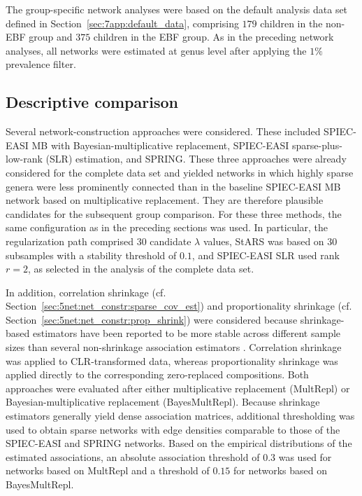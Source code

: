 The group-specific network analyses were based on the default analysis data set defined in Section~\ref{sec:7app:default_data}, comprising $179$ children in the non-EBF group and $375$ children in the EBF group. As in the preceding network analyses, all networks were estimated at genus level after applying the $1\%$ prevalence filter.

\subsection{Descriptive comparison}
\label{sec:7app:network:comparison}

Several network-construction approaches were considered. These included SPIEC-EASI MB with Bayesian-multiplicative replacement, SPIEC-EASI sparse-plus-low-rank (SLR) estimation, and SPRING. These three approaches were already considered for the complete data set and yielded networks in which highly sparse genera were less prominently connected than in the baseline SPIEC-EASI MB network based on multiplicative replacement. They are therefore plausible candidates for the subsequent group comparison. For these three methods, the same configuration as in the preceding sections was used. In particular, the regularization path comprised $30$ candidate $\lambda$ values, StARS was based on $30$ subsamples with a stability threshold of $0.1$, and SPIEC-EASI SLR used rank $r=2$, as selected in the analysis of the complete data set.

In addition, correlation shrinkage (cf. Section~\ref{sec:5net:net_constr:sparse_cov_est}) and proportionality shrinkage (cf. Section~\ref{sec:5net:net_constr:prop_shrink}) were considered because shrinkage-based estimators have been reported to be more stable across different sample sizes than several non-shrinkage association estimators \citep{badri2020shrinkage}. Correlation shrinkage was applied to CLR-transformed data, whereas proportionality shrinkage was applied directly to the corresponding zero-replaced compositions. Both approaches were evaluated after either multiplicative replacement (MultRepl) or Bayesian-multiplicative replacement (BayesMultRepl). Because shrinkage estimators generally yield dense association matrices, additional thresholding was used to obtain sparse networks with edge densities comparable to those of the SPIEC-EASI and SPRING networks. Based on the empirical distributions of the estimated associations, an absolute association threshold of $0.3$ was used for networks based on MultRepl and a threshold of $0.15$ for networks based on BayesMultRepl.

